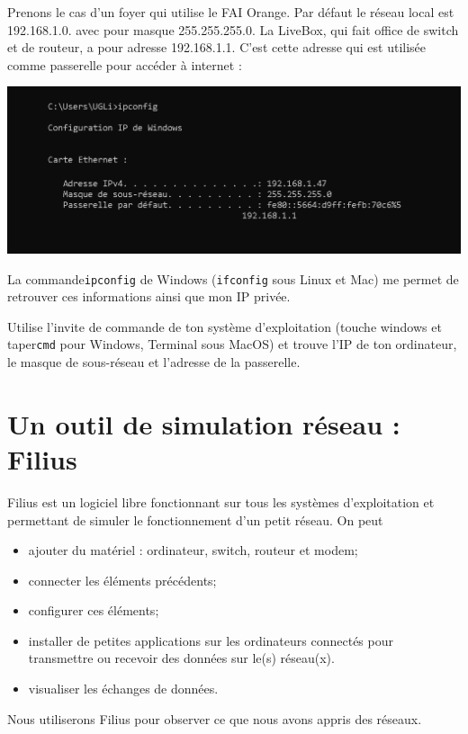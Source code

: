 \begin{remarque}[]
    Prenons le cas d'un foyer qui utilise le FAI Orange. Par défaut le réseau local est 192.168.1.0. avec pour masque 255.255.255.0. La LiveBox, qui fait office de switch et de routeur, a pour adresse 192.168.1.1. C'est cette adresse qui est utilisée comme passerelle pour accéder à internet :
    \begin{center}
        \includegraphics[width=\textwidth]{ch-reseaulocal/img/ipconfig.png}
    \end{center}

    La commande\texttt{ipconfig} de Windows (\texttt{ifconfig} sous Linux et Mac) me permet de retrouver ces informations ainsi que mon IP privée.
\end{remarque}
\begin{exercice}[]
    Utilise l'invite de commande de ton système d'exploitation (touche windows et taper\texttt{cmd} pour Windows, Terminal sous MacOS) et trouve l'IP de ton ordinateur, le masque de sous-réseau et l'adresse de la passerelle.
\end{exercice}
\section{Un outil de simulation réseau : Filius}

Filius est un logiciel libre fonctionnant sur tous les systèmes d'exploitation et permettant de simuler le fonctionnement d'un petit réseau. On peut
\begin{itemize}
    \item    ajouter du matériel : ordinateur, switch, routeur et modem;
    \item    connecter les éléments précédents;
    \item    configurer ces éléments;
    \item    installer de petites applications sur les ordinateurs connectés pour transmettre ou recevoir des données sur le(s) réseau(x).
    \item    visualiser les échanges de données.
\end{itemize}

Nous utiliserons Filius pour observer ce que nous avons appris des réseaux.


